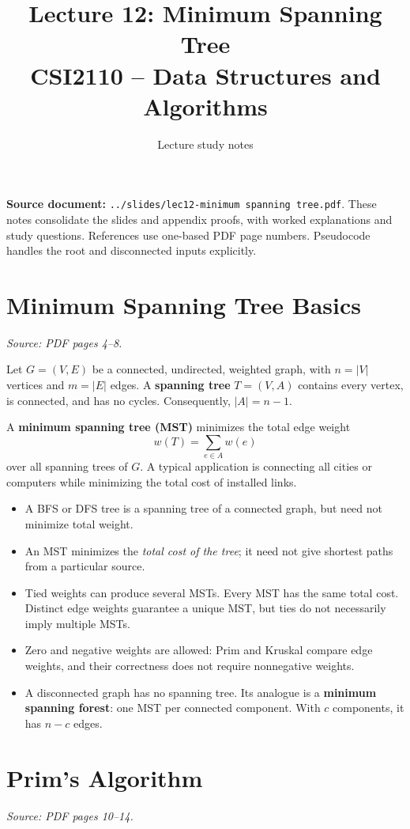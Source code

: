 \documentclass[11pt,letterpaper]{article}
\title{\textbf{Lecture 12: Minimum Spanning Tree}\\\large CSI2110 -- Data Structures and Algorithms}\author{Lecture study notes}\date{}
\newcommand{\sourcepages}[1]{\textit{Source: PDF pages #1.}}
\begin{document}
\maketitle
\textbf{Source document:} \texttt{../slides/lec12-minimum spanning tree.pdf}. These notes consolidate the slides and appendix proofs, with worked explanations and study questions. References use one-based PDF page numbers. Pseudocode handles the root and disconnected inputs explicitly.
\tableofcontents\newpage

\section{Minimum Spanning Tree Basics}
\sourcepages{4--8}

Let $G=(V,E)$ be a connected, undirected, weighted graph, with $n=|V|$ vertices and $m=|E|$ edges. A \textbf{spanning tree} $T=(V,A)$ contains every vertex, is connected, and has no cycles. Consequently, $|A|=n-1$.

A \textbf{minimum spanning tree (MST)} minimizes the total edge weight
\[
  w(T)=\sum_{e\in A}w(e)
\]
over all spanning trees of $G$. A typical application is connecting all cities or computers while minimizing the total cost of installed links.

\begin{itemize}
  \item A BFS or DFS tree is a spanning tree of a connected graph, but need not minimize total weight.
  \item An MST minimizes the \emph{total cost of the tree}; it need not give shortest paths from a particular source.
  \item Tied weights can produce several MSTs. Every MST has the same total cost. Distinct edge weights guarantee a unique MST, but ties do not necessarily imply multiple MSTs.
  \item Zero and negative weights are allowed: Prim and Kruskal compare edge weights, and their correctness does not require nonnegative weights.
  \item A disconnected graph has no spanning tree. Its analogue is a \textbf{minimum spanning forest}: one MST per connected component. With $c$ components, it has $n-c$ edges.
\end{itemize}

\section{Prim's Algorithm}
\sourcepages{10--14}
\end{document}

